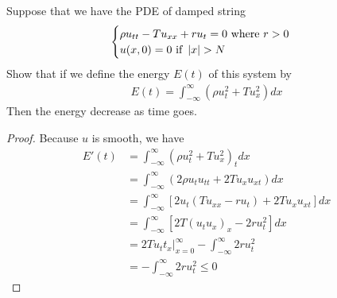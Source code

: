 \documentclass{report}
\begin{document}
\begin{question}{}{}
Suppose that we have the PDE of damped string 
\begin{align*}
  \begin{cases}    
\rho u_{tt}-T u_{xx}+ru_t=0\text{ where }r>0\\
u(x,0)=0 \text{ if }\abso{x}>N
  \end{cases}
\end{align*}
Show that if we define the energy $E(t)$ of this system by 
\begin{align*}
E(t)=\int_{-\infty}^{\infty} (\rho u_t^2 + Tu_x^2)dx
\end{align*}
Then the energy decrease as time goes. 
\end{question}
\begin{proof}
Because $u$ is smooth, we have 
\begin{align*}
E'(t)&=\int_{-\infty}^{\infty} (\rho u_t^2+Tu_x^2)_tdx\\
&=\int_{-\infty}^{\infty} (2\rho u_tu_{tt}+2Tu_xu_{xt})dx\\
&=\int_{-\infty}^{\infty} [2u_t(Tu_{xx}-ru_t)+2Tu_xu_{xt}]dx\\
&=\int_{-\infty}^{\infty} [2T(u_tu_x)_x-2ru_t^2]dx \\
&=2Tu_tt_x\Big|_{x=0}^{\infty} - \int_{-\infty}^{\infty} 2ru_t^2\\
&=- \int_{-\infty}^{\infty} 2ru_t^2\leq  0
\end{align*}
\end{proof}
\end{document}
